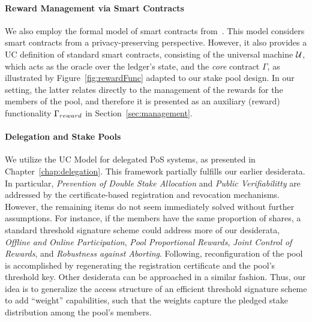 \paragraph{Reward Management via Smart Contracts}
We also employ the formal model of smart contracts from~\cite{kachina}. This
model considers smart contracts from a privacy-preserving perspective.
However, it also provides a UC definition of standard smart contracts,
consisting of the universal machine $\mathcal{U}$, which acts as the oracle over the
ledger's state, and the \emph{core} contract $\Gamma$, as illustrated by
Figure~\ref{fig:rewardFunc} adapted to our stake pool design. In our setting,
the latter relates directly to the management of the rewards for the members of
the pool, and therefore it is presented as an auxiliary (reward) functionality
$\Gamma_{reward}$ in Section~\ref{sec:management}.

\paragraph{Delegation and Stake Pools}\label{sec:delegation}
We utilize the UC Model for delegated PoS systems, as presented in
Chapter~\ref{chap:delegation}. This framework partially fulfills our earlier
desiderata. In particular, \emph{Prevention of Double Stake Allocation} and
\emph{Public Verifiabilitty} are addressed by the certificate-based
registration and revocation mechanisms.  However, the remaining items do not
seem immediately solved without further assumptions. For instance, if the
members have the same proportion of shares, a standard threshold signature
scheme could address more of our desiderata, \eg \emph{Offline and Online
Participation}, \emph{Pool Proportional Rewards}, \emph{Joint Control of
Rewards}, and \emph{Robustness against Aborting}.  Following, reconfiguration
of the pool is accomplished by regenerating the registration certificate and
the pool's threshold key. Other desiderata can be approached in a similar
fashion. Thus, our idea is to generalize the access structure of an efficient
threshold signature scheme to add ``weight'' capabilities, such that the
weights capture the pledged stake distribution among the pool's members.
